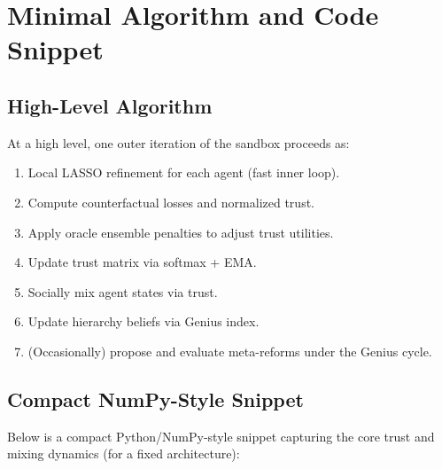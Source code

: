 \documentclass[11pt]{article}
\begin{document}
\section{Minimal Algorithm and Code Snippet}

\subsection{High-Level Algorithm}

At a high level, one outer iteration of the sandbox proceeds as:
\begin{enumerate}[noitemsep]
  \item Local LASSO refinement for each agent (fast inner loop).
  \item Compute counterfactual losses and normalized trust.
  \item Apply oracle ensemble penalties to adjust trust utilities.
  \item Update trust matrix via softmax + EMA.
  \item Socially mix agent states via trust.
  \item Update hierarchy beliefs via Genius index.
  \item (Occasionally) propose and evaluate meta-reforms under the
        Genius cycle.
\end{enumerate}

\subsection{Compact NumPy-Style Snippet}

Below is a compact Python/NumPy-style snippet capturing the core trust
and mixing dynamics (for a fixed architecture):
\end{document}
